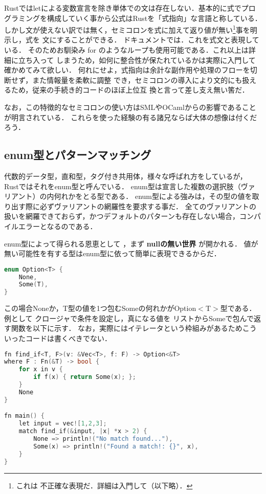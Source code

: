 Rustではletによる変数宣言を除き単体での文は存在しない．基本的に式でプログラミングを構成していく事から公式はRustを「式指向」な言語と称している．
しかし文が使えない訳では無く，セミコロンを式に加えて返り値が無い\footnote{これは
  不正確な表現だ．詳細は入門して（以下略）．}事を明示し，式を
文にすることができる．
ドキュメントでは．これを式文と表現している．
そのためお馴染み for のようなループも使用可能である．これ以上は詳細に立ち入って
しまうため，如何に整合性が保たれているかは実際に入門して確かめてみて欲しい．
何れにせよ，式指向は余計な副作用や処理のフローを切断せず，また情報量を柔軟に調整
でき，セミコロンの導入により文的にも扱えるため，従来の手続き的コードのほぼ上位互
換と言って差し支え無い筈だ．

なお，この特徴的なセミコロンの使い方はSMLやOCamlからの影響であることが明言されている．
これらを使った経験の有る諸兄ならば大体の想像は付くだろう．

\subsection{enum型とパターンマッチング}
代数的データ型，直和型，タグ付き共用体，様々な呼ばれ方をしているが，
Rustではそれをenum型と呼んでいる．
enum型は宣言した複数の選択肢（ヴァリアント）の内何れかをとる型である．
enum型による強みは，その型の値を取り出す際に必ずヴァリアントの網羅性を要求する事だ．
全てのヴァリアントの扱いを網羅できておらず，かつデフォルトのパターンも存在しない場合，コンパイルエラーとなるのである．

enum型によって得られる恩恵として
，まず \textbf{nullの無い世界} が開かれる．
値が無い可能性を有する型はenum型に依って簡単に表現できるからだ．

\begin{lstlisting}[language={C++},caption=Option型,label=option_t]
enum Option<T> {
    None,
    Some(T),
}
\end{lstlisting}

この場合Noneか，T型の値を1つ包むSomeの何れかがOption$<$T$>$型である．
例として
クロージャで条件を設定し，真になる値を
リストからSomeで包んで返す関数を以下に示す．
なお，実際にはイテレータという枠組みがあるためこういったコードは書くべきでない．

\begin{lstlisting}[language={C++},caption=条件に応じた値が見つかれば返す関数,label=find_if]
fn find_if<T, F>(v: &Vec<T>, f: F) -> Option<&T>
where F : Fn(&T) -> bool {
    for x in v {
        if f(x) { return Some(x); };
    }
    None
}

fn main() {
    let input = vec![1,2,3];
    match find_if(&input, |x| *x > 2) {
        None => println!("No match found..."),
        Some(x) => println!("Found a match!: {}", x),
    }
}
\end{lstlisting}

